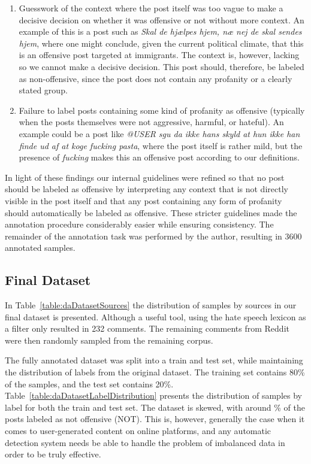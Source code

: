 \documentclass{article}
\begin{document}
\begin{enumerate}
    \item Guesswork of the context where the post itself was too vague to make a decisive decision on whether it was offensive or not without more context. An example of this is a post such as \textit{Skal de hjælpes hjem, næ nej de skal sendes hjem}, where one might conclude, given the current political climate, that this is an offensive post targeted at immigrants. The context is, however, lacking so we cannot make a decisive decision. This post should, therefore, be labeled as non-offensive, since the post does not contain any profanity or a clearly stated group.
    \item Failure to label posts containing some kind of profanity as offensive (typically when the posts themselves were not aggressive, harmful, or hateful). An example could be a post like \textit{@USER sgu da ikke hans skyld at hun ikke han finde ud af at koge fucking pasta}, where the post itself is rather mild, but the presence of \textit{fucking} makes this an offensive post according to our definitions.
\end{enumerate}

In light of these findings our internal guidelines were refined so that no post should be labeled as offensive by interpreting any context that is not directly visible in the post itself  and that any post containing any form of profanity should automatically be labeled as offensive. These stricter guidelines made the annotation procedure considerably easier while ensuring consistency. The remainder of the annotation task was performed by the author, resulting in 3600 annotated samples.


\subsection{Final Dataset}\label{sec:resultingDataset}
In Table~\ref{table:daDatasetSources} the distribution of samples by sources in our final dataset is presented. Although a useful tool, using the hate speech lexicon as a filter only resulted in 232 comments. The remaining comments from Reddit were then randomly sampled from the remaining corpus.

The fully annotated dataset was split into a train and test set, while maintaining the distribution of labels from the original dataset. The training set contains 80\% of the samples, and the test set contains 20\%. Table~\ref{table:daDatasetLabelDistribution} presents the distribution of samples by label for both the train and test set. The dataset is skewed, with around \% of the posts labeled as not offensive (NOT). This is, however, generally the case when it comes to user-generated content on online platforms, and any automatic detection system needs be able to handle the problem of imbalanced data in order to be truly effective.
\end{document}
